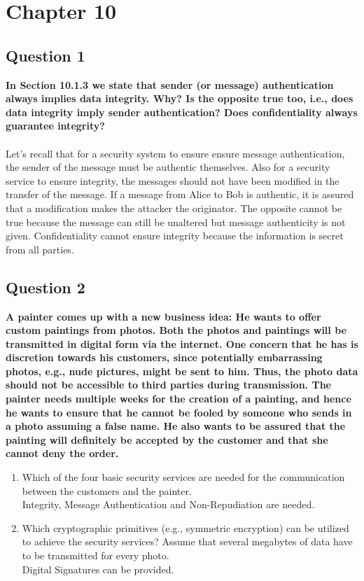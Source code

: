 \documentclass[titlepage]{article}
\begin{document}
\section{Chapter 10}
{
\subsection{Question 1}
{
\textbf{In Section 10.1.3 we state that sender (or message) authentication always implies data integrity. Why? Is the opposite true too, i.e., does data integrity imply sender authentication? Does confidentiality always guarantee integrity?}\\\\
Let's recall that for a security system to ensure ensure message authentication, the sender of the message must be authentic themselves. Also for a security service to ensure integrity, the messages should not have been modified in the transfer of the message. If a message from Alice to Bob is authentic, it is assured that a modification makes the attacker the originator. The opposite cannot be true because the message can still be unaltered but message authenticity is not given. Confidentiality cannot ensure integrity because the information is secret from all parties.
}
\subsection{Question 2}
{
\textbf{A painter comes up with a new business idea: He wants to offer custom paintings from photos. Both the photos and paintings will be transmitted in digital form via the internet. One concern that he has is discretion towards his customers, since potentially embarrassing photos, e.g., nude pictures, might be sent to him. Thus, the photo data should not be accessible to third parties during transmission. The painter needs multiple weeks for the creation of a painting, and hence he wants to ensure that he cannot be fooled by someone who sends in a photo assuming a false name. He also wants to be assured that the painting will definitely be accepted by the customer and that she cannot deny the order.}
\begin{enumerate}
    \item Which of the four basic security services are needed for the communication between the customers and the painter.\\Integrity, Message Authentication and Non-Repudiation are needed.
    \item Which cryptographic primitives (e.g., symmetric encryption) can be utilized to achieve the security services? Assume that several megabytes of data have to be transmitted for every photo.\\Digital Signatures can be provided.
\end{enumerate}
}
}
\end{document}
